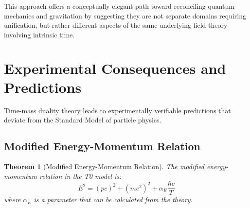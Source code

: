 \documentclass{article}
\newtheorem{theorem}{Theorem}[section]
\theoremstyle{definition}
\theoremstyle{remark}
\begin{document}
This approach offers a conceptually elegant path toward reconciling quantum mechanics and gravitation by suggesting they are not separate domains requiring unification, but rather different aspects of the same underlying field theory involving intrinsic time.
	
	\section{Experimental Consequences and Predictions}
	
	Time-mass duality theory leads to experimentally verifiable predictions that deviate from the Standard Model of particle physics.
	
	\subsection{Modified Energy-Momentum Relation}
	
	\begin{theorem}[Modified Energy-Momentum Relation]
		The modified energy-momentum relation in the T0 model is:
		\begin{equation}
			E^2 = (pc)^2 + (mc^2)^2 + \alpha_E\frac{\hbar c}{T}
		\end{equation}
		where $\alpha_E$ is a parameter that can be calculated from the theory.
	\end{theorem}
	
\end{document}

